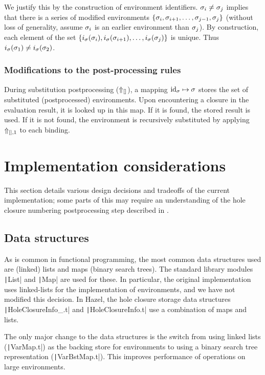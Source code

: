 We justify this by the construction of environment identifiers. $\sigma_i\ne\sigma_j$ implies that there is a series of modified environments $\{\sigma_i,\sigma_{i+1},\dots,\sigma_{j-1},\sigma_j\}$ (without loss of generality, assume $\sigma_i$ is an earlier environment than $\sigma_j$). By construction, each element of the set $\{i_\sigma(\sigma_i),i_\sigma(\sigma_{i+1}),\dots,i_\sigma(\sigma_j)\}$ is unique. Thus $i_\sigma(\sigma_1)\ne i_\sigma(\sigma_2)$.

\subsubsection{Modifications to the post-processing rules}
\label{sec:memoization-postprocessing}

During substitution postprocessing ($\Uparrow_{[]}$), a mapping $\text{id}_\sigma\mapsto\sigma$ stores the set of substituted (postprocessed) environments. Upon encountering a closure in the evaluation result, it is looked up in this map. If it is found, the stored result is used. If it is not found, the environment is recursively substituted by applying $\Uparrow_{[],1}$ to each binding.

\section{Implementation considerations}
\label{sec:evalenv_impl_considerations}

This section details various design decisions and tradeoffs of the current implementation; some parts of this may require an understanding of the hole closure numbering postprocessing step described in .

\subsection{Data structures}
\label{sec:data-structures}

As is common in functional programming, the most common data structures used are (linked) lists and maps (binary search trees). The standard library modules \texttt|List| and \texttt|Map| are used for these. In particular, the original implementation uses linked-lists for the implementation of environments, and we have not modified this decision. In Hazel, the hole closure storage data structures \texttt|HoleClosureInfo_.t| and \texttt|HoleClosureInfo.t| use a combination of maps and lists.

The only major change to the data structures is the switch from using linked lists (\texttt|VarMap.t|) as the backing store for environments to using a binary search tree representation (\texttt|VarBstMap.t|). This improves performance of operations on large environments.

